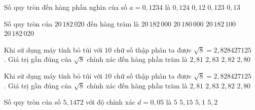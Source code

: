 

\begin{ex}%
	Số quy tròn đến hàng  phần nghìn của số $ a=0{,}1234$ là
	 \choice
		{$ 0{,}124$} 
		{$ 0{,}12$} 
		{\True $  0{,}123$}
		{$ 0{,}13$} 
\end{ex}

\begin{ex}%
	Số quy tròn của $20 \, 182 \, 020$  đến hàng trăm là
	\choice 
		 {\True $20\, 182 \, 000$}
		{$20 \, 180  \, 000$}
		{$20\, 182  \, 100$}
		{$20\,  182\, 020$}
\end{ex}

\begin{ex}%
	Khi sử dụng máy tính bỏ túi với $ 10$ chữ số thập phân ta được $\sqrt{8}=2{,}828427125$. Giá trị gần đúng của $\sqrt{8}$ chính xác đến hàng phần trăm  là
	 \choice
		{$ 2{,}81$} 
		{\True  $ 2{,}83$}
		{$  2{,}82$}
		{$  2{,}80$}
\end{ex}

\begin{ex}%
	Khi sử dụng máy tính bỏ túi với $10$ chữ số thập phân ta được $\sqrt{8}=2{,}828427125$. Giá trị gần đúng của $\sqrt{8}$  chính xác đến hàng phần trăm là
	 \choice
		{$2{,}81$} 
		{\True  $2{,}83$}
		 {$2{,}82$}
		 {$2{,}80$}
\end{ex}

\begin{ex}%
	Số quy tròn của số $5{,}1472$ với  độ chính xác $d=0{,}05$ là
	 \choice
		{$5$} 
		{$5{,}15$} 
		{\True  $5{,}1$}
		 {$5{,}2$}
\end{ex}

